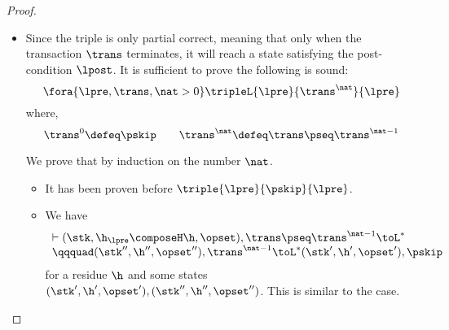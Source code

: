 \begin{proof}
\begin{itemize}
\item {}
Since the triple is only partial correct, 
meaning that only when the transaction \( \trans \) terminates, it will reach a state satisfying the post-condition \( \lpost \).
It is sufficient to prove the following is sound:
\[
    \fora{\lpre, \trans, \nat > 0} \tripleL{\lpre}{\trans^{\nat}}{\lpre}
\]
where,
\[
    \trans^{0} \defeq  \pskip \qquad
    \trans^{\nat} \defeq  \trans \pseq \trans^{\nat - 1} 
\]

We prove that by induction on the number \( \nat \).
\begin{itemize}
    \item {} It has been proven before \( \triple{\lpre}{\pskip}{\lpre} \).
    \item {} We have 
    \[ 
        \begin{array}{l}
        \vdash (\stk, \h_\lpre \composeH \h, \opset), \trans \pseq \trans^{\nat - 1} \toL^{*} \\
        \qqquad (\stk'', \h'', \opset''), \trans^{\nat - 1} \toL^{*} (\stk', \h', \opset'), \pskip  
        \end{array}
    \]
    for a residue \( \h \) and some states \( ( \stk', \h', \opset' ), ( \stk'', \h'', \opset'' ) \).
    This is similar to the  case.
\end{itemize}


\end{itemize}
\end{proof}
